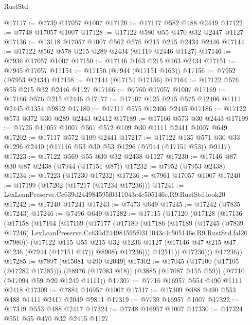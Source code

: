 \begin{lexlean}{RustStd}
\begin{coremodule}
@17117 := @7739 @17057 @1007
@17120 := @17117 @582 @488 @2449
@17122 := @7748 @17057 @1007
@17128 := @17122 @580 @55 @470 @32 @2447 @1127
@17136 := @13118 @17057 @1007 @562 @576 @215 @215 @2434 @2446
@17144 := @17122 @562 @578 @215 @289 @2434 (@1119 @2446 @1127)
@17146 := @7936 @17057 @1007
@17150 := @17146 @163 @215 @163 @2434
@17151 := @7945 @17057
@17154 := @17150 (@7944 (@17151 @163))
@17156 := @7952 (@7953 @2434)
@17158 := @17144 (@17154 @17156)
@17164 := @17122 @576 @55 @215 @32 @2446 @1127
@17166 := @7760 @17057 @1007
@17169 := @17166 @576 @215 @2446
@17177 := @17107 @125 @215 @575 @12406 @1111 @2445 @1354 @9812
@17180 := @17117 @575 @12406 @2445
@17186 := @17122 @573 @372 @30 @289 @2443 @2412
@17189 := @17166 @573 @30 @2443
@17199 := @7725 @17057 @1007 @567 @572 @109 @30 @1111 @2441 @1007 @649
@17202 := @17117 @572 @109 @2441
@17217 := @17122 @135 @571 @30 @33 @1296 @2440 (@17146 @53 @30 @53 @1296 (@7944 (@17151 @53)) @9117)
@17223 := @17122 @569 @55 @30 @32 @2438 @1127
@17230 := @17146 @87 @30 @87 @2438 (@7944 (@17151 @87))
@17232 := @7952 (@7953 @2438)
@17234 := @17223 (@17230 @17232)
@17236 := @7961 @17057 @1007
@17240 := @17199 (@17202 (@17217 (@17234 @17236)))
@17241 := LexLeanPreserve.Cc639d244984595f0311043c4c505146e.R9.RustStd.look20
@17242 := @17240 @17241
@17243 := @7473 @649
@17245 := @17242 (@7835 @17243)
@17246 := @7496 @649
@17282 := @17115
    (@17120
      (@17128
        (@17136
          (@17158
            (@17164
              (@17169
                (@17177
                  (@17180
                    (@17186
                      (@17189
                        (@17245
                          (@7839 @17246)
                          LexLeanPreserve.Cc639d244984595f0311043c4c505146e.R9.RustStd.fal20
                          @7980))
                      (@17122
                        @115
                        @55
                        @215
                        @32
                        @1236
                        @1127
                        (@17146 @47 @215 @47 @1236 (@7944 (@17151 @47)) @8908)
                        @17236)))
                  @12511))
              @17236)))
        @17236))
@17285 := @7897 (@15081 @490 @2049)
@17302 := @17045
    (@17100 (@17105 (@17282 @17285)))
    (@8976 (@17083 @18))
    (@3885 (@17087 @155 @59))
    (@7710 (@17094 @59 @20 @1249 @1111))
@17307 := @7716 @16957 @554 @490 @1111 @2418
@17309 := @7884 @16957 @1007
@17317 := @17309 @388 @490 @553 @488 @1111 @2417 @2049 @9811
@17319 := @7739 @16957 @1007
@17322 := @17319 @553 @488 @2417
@17324 := @7748 @16957 @1007
@17330 := @17324 @551 @55 @470 @32 @2415 @1127

\end{coremodule}
\end{lexlean}
